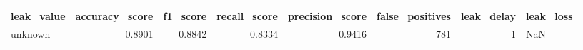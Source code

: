 \begin{tabular}{lrrrrrrl}
\toprule
leak\_value & accuracy\_score & f1\_score & recall\_score & precision\_score & false\_positives & leak\_delay & leak\_loss \\
\midrule
unknown & 0.8901 & 0.8842 & 0.8334 & 0.9416 & 781 & 1 & NaN \\
\bottomrule
\end{tabular}

